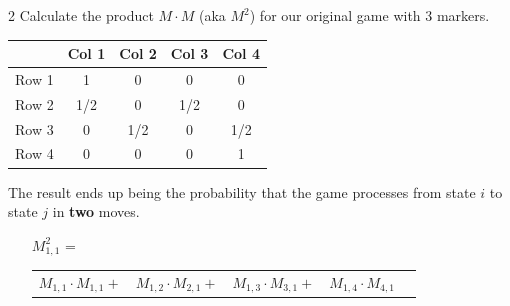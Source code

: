 \documentclass[a4paper,12pt]{book}
\newcounter{question}
\begin{document}
        \notonkey{ \newpage }{ \hrulefill }
    
        \begin{question}{\thequestion}{2}
            Calculate the product $M \cdot M$ (aka $M^{2}$) for our
            original game with 3 markers.
            
            \begin{center}
                \begin{tabular}{ l | c c c c |}
                    & Col 1 & Col 2 & Col 3 & Col 4
                    \\ \hline
                    Row 1 & 1 & 0 & 0 & 0
                    \\
                    Row 2 & 1/2 & 0 & 1/2 & 0
                    \\
                    Row 3 & 0 & 1/2 & 0 & 1/2
                    \\
                    Row 4 & 0 & 0 & 0 & 1
                \end{tabular}
            \end{center}


            The result ends up being the probability that the game processes from
            state $i$ to state $j$ in \textbf{two} moves.

            \begin{enumerate}
                \item[$M^{2}_{1,1}$] =
                            \begin{tabular}{c c c c c}
                                
                                $M_{1,1} \cdot M_{1,1} +$ &
                                $M_{1,2} \cdot M_{2,1} +$ &
                                $M_{1,3} \cdot M_{3,1} +$ &
                                $M_{1,4} \cdot M_{4,1}$
                                \\
                                

\end{tabular}
\end{enumerate}
\end{question}
\end{document}

